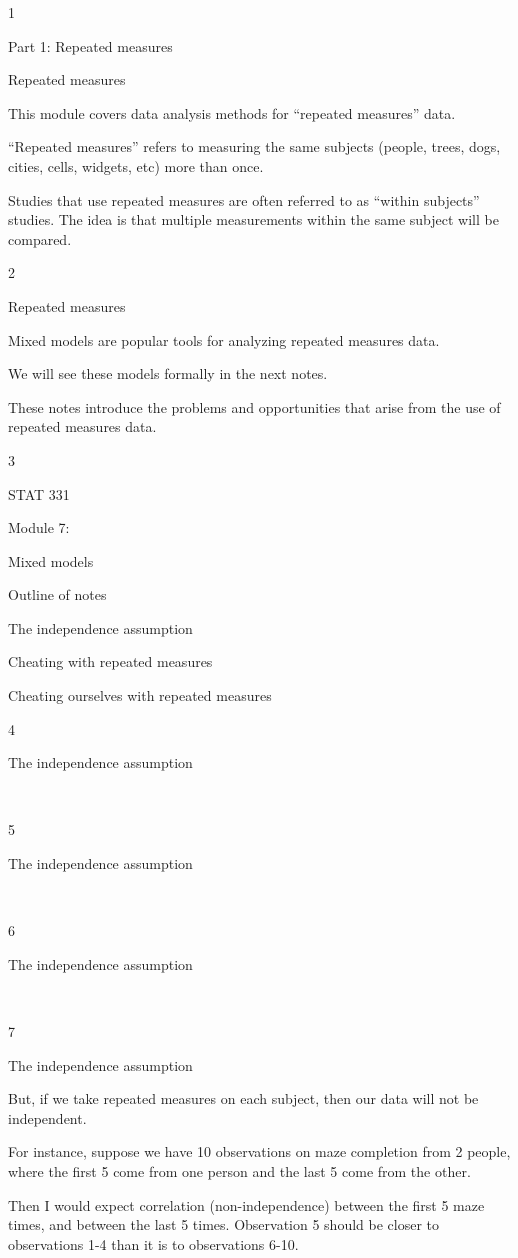 \documentclass[
  letterpaper,
  DIV=11,
  numbers=noendperiod]{scrreprt}
\begin{document}
1

Part 1: Repeated measures

Repeated measures

This module covers data analysis methods for ``repeated measures'' data.

``Repeated measures'' refers to measuring the same subjects (people,
trees, dogs, cities, cells, widgets, etc) more than once.

Studies that use repeated measures are often referred to as ``within
subjects'' studies. The idea is that multiple measurements within the
same subject will be compared.

2

Repeated measures

Mixed models are popular tools for analyzing repeated measures data.

We will see these models formally in the next notes.

These notes introduce the problems and opportunities that arise from the
use of repeated measures data.

3

STAT 331

Module 7:

Mixed models

Outline of notes

The independence assumption

Cheating with repeated measures

Cheating ourselves with repeated measures

4

The independence assumption

~

5

The independence assumption

~

6

The independence assumption

~

7

The independence assumption

But, if we take repeated measures on each subject, then our data will
not be independent.

For instance, suppose we have 10 observations on maze completion from 2
people, where the first 5 come from one person and the last 5 come from
the other.

Then I would expect correlation (non-independence) between the first 5
maze times, and between the last 5 times. Observation 5 should be closer
to observations 1-4 than it is to observations 6-10.
\end{document}
